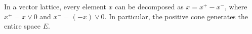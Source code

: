 In a vector lattice, every element $x$ can be decomposed as $x = x^+ - x^-$, where $x^+ = x \vee 0$ and $x^- = (-x) \vee 0$. In particular, the positive cone generates the entire space $E$.
